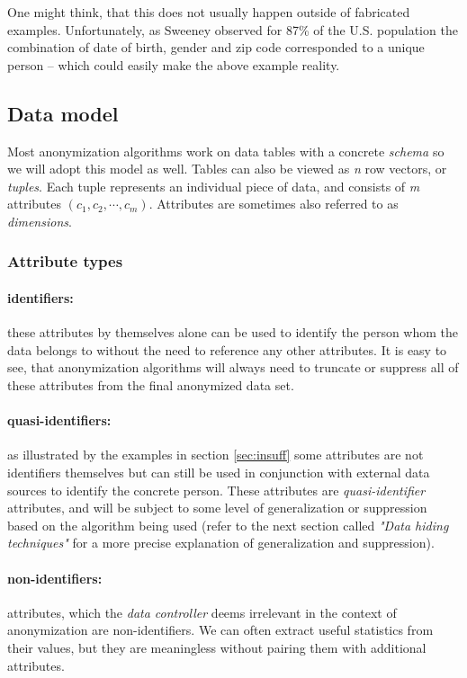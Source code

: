 One might think, that this does not usually happen outside of fabricated examples. Unfortunately, as Sweeney observed \cite{sweeney} for 87\% of the U.S. population the combination of date of birth, gender and zip code corresponded to a unique person \cite{aggarwal} -- which could easily make the above example reality.

\subsection{Data model} \label{sec:data_model}

Most anonymization algorithms work on data tables with a concrete \textit{schema} so we will adopt this model as well. Tables can also be viewed as \textit{n} row vectors, or \textit{tuples}. Each tuple represents an individual piece of data, and consists of \textit{m} attributes \((c_1, c_2, \cdots, c_m)\). Attributes are sometimes also referred to as \textit{dimensions}.

\subsubsection{Attribute types}

\paragraph{identifiers:} these attributes by themselves alone can be used to identify the person whom the data belongs to without the need to reference any other attributes. It is easy to see, that anonymization algorithms will always need to truncate or suppress all of these attributes from the final anonymized data set.

\paragraph{quasi-identifiers:} as illustrated by the examples in section \ref{sec:insuff} some attributes are not identifiers themselves but can still be used in conjunction with external data sources to identify the concrete person. These attributes are \textit{quasi-identifier} attributes, and will be subject to some level of generalization or suppression based on the algorithm being used (refer to the next section called \textit{"Data hiding techniques"} for a more precise explanation of generalization and suppression).

\paragraph{non-identifiers:} attributes, which the \textit{data controller} deems irrelevant in the context of anonymization are non-identifiers. We can often extract useful statistics from their values, but they are meaningless without pairing them with additional attributes.

